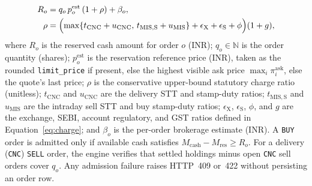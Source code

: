 \documentclass[12pt]{article}
\begin{document}
\begin{equation}
\begin{aligned}
R_o &= q_o\,p^{\mathrm{est}}_o\,(1+\rho)+\beta_o,\\
\rho &= \Bigl(\max\{t_{\mathrm{CNC}}+u_{\mathrm{CNC}},\,t_{\mathrm{MIS,S}}+u_{\mathrm{MIS}}\} + \epsilon_{\mathrm{X}}+\epsilon_{\mathrm{S}}+\phi\Bigr)(1+g),
\end{aligned}
\label{eq:reserve}
\end{equation}
where $R_o$ is the reserved cash amount for order $o$ (INR); $q_o\in\mathbb{N}$ is the order quantity (shares); $p^{\mathrm{est}}_o$ is the reservation reference price (INR), taken as the rounded \texttt{limit\_price} if present, else the highest visible ask price $\max_i \pi^{\mathrm{ask}}_i$, else the quote's last price; $\rho$ is the conservative upper-bound statutory charge ratio (unitless); $t_{\mathrm{CNC}}$ and $u_{\mathrm{CNC}}$ are the delivery STT and stamp-duty ratios; $t_{\mathrm{MIS,S}}$ and $u_{\mathrm{MIS}}$ are the intraday sell STT and buy stamp-duty ratios; $\epsilon_{\mathrm{X}}$, $\epsilon_{\mathrm{S}}$, $\phi$, and $g$ are the exchange, SEBI, account regulatory, and GST ratios defined in Equation~\eqref{eq:charge}; and $\beta_o$ is the per-order brokerage estimate (INR). A \texttt{BUY} order is admitted only if available cash satisfies $M_{\mathrm{cash}} - M_{\mathrm{res}} \ge R_o$. For a delivery (\texttt{CNC}) \texttt{SELL} order, the engine verifies that settled holdings minus open \texttt{CNC} sell orders cover $q_o$. Any admission failure raises HTTP~409 or~422 without persisting an order row.
\end{document}

